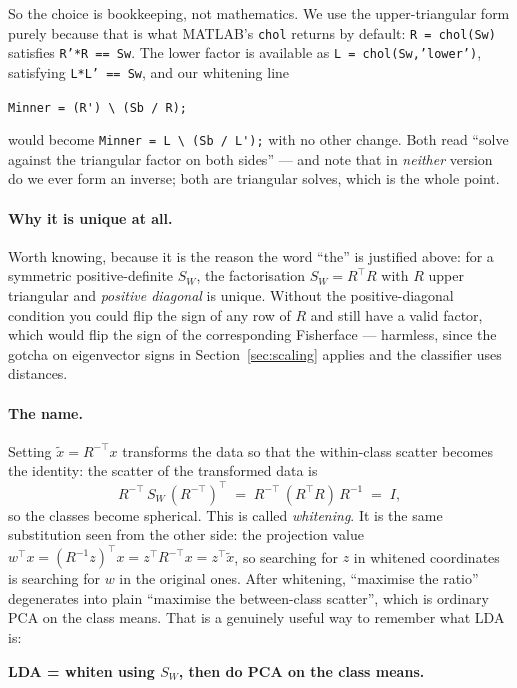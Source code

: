 \documentclass[11pt]{article}
\theoremstyle{definition}
\theoremstyle{remark}
\newcommand{\Sw}{S_W}
\begin{document}
So the choice is bookkeeping, not mathematics. We use the upper-triangular form
purely because that is what MATLAB's \texttt{chol} returns by default:
\texttt{R = chol(Sw)} satisfies \texttt{R'*R == Sw}. The lower factor is
available as \texttt{L = chol(Sw,'lower')}, satisfying \texttt{L*L' == Sw}, and
our whitening line
\begin{center}\verb|Minner = (R') \ (Sb / R);|\end{center}
would become \verb|Minner = L \ (Sb / L');| with no other
change. Both read ``solve against the triangular factor on both sides'' --- and
note that in \emph{neither} version do we ever form an inverse; both are
triangular solves, which is the whole point.

\paragraph{Why it is unique at all.} Worth knowing, because it is the reason the
word ``the'' is justified above: for a symmetric positive-definite $\Sw$, the
factorisation $\Sw = R^{\!\top}R$ with $R$ upper triangular and
\emph{positive diagonal} is unique. Without the positive-diagonal condition you
could flip the sign of any row of $R$ and still have a valid factor, which would
flip the sign of the corresponding Fisherface --- harmless, since
the gotcha on eigenvector signs in Section~\ref{sec:scaling} applies and
the classifier uses distances.

\paragraph{The name.} Setting $\tilde x = R^{-\top}x$ transforms the data so that
the within-class scatter becomes the identity: the scatter of the transformed data
is
\[
  R^{-\top}\,\Sw\,(R^{-\top})^{\!\top} \;=\; R^{-\top}\,(R^{\!\top}R)\,R^{-1} \;=\; I ,
\]
so the classes become spherical. This is called \emph{whitening}. It is the same
substitution seen from the other side: the projection value
$w^{\!\top}x = (R^{-1}z)^{\!\top}x = z^{\!\top}R^{-\top}x = z^{\!\top}\tilde x$, so searching for
$z$ in whitened coordinates is searching for $w$ in the original ones. After whitening, ``maximise the ratio'' degenerates into
plain ``maximise the between-class scatter'', which is ordinary PCA on the class
means. That is a genuinely useful way to remember what LDA is:
\begin{center}
\textbf{LDA = whiten using $\Sw$, then do PCA on the class means.}
\end{center}
\end{document}

